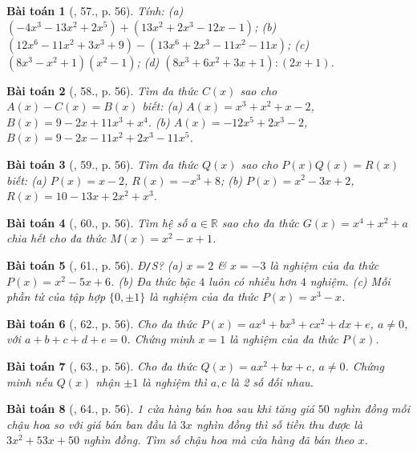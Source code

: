 \documentclass{article}
\newtheorem{baitoan}{Bài toán}
\begin{document}
\begin{baitoan}[\cite{SBT_Toan_7_Canh_Dieu_tap_2}, 57., p. 56]
	Tính: (a) $(-4x^3 - 13x^2 + 2x^5) + (13x^2 + 2x^3 - 12x - 1)$; (b) $(12x^6 - 11x^2 + 3x^3 + 9) - (13x^6 + 2x^3 - 11x^2 - 11x)$; (c) $(8x^3 - x^2 + 1)(x^2 - 1)$; (d) $(8x^3 + 6x^2 + 3x + 1):(2x + 1)$.
\end{baitoan}

\begin{baitoan}[\cite{SBT_Toan_7_Canh_Dieu_tap_2}, 58., p. 56]
	Tìm đa thức $C(x)$ sao cho $A(x) - C(x) = B(x)$ biết: (a) $A(x) = x^3 + x^2 + x - 2$, $B(x) = 9 - 2x + 11x^3 + x^4$. (b) $A(x) = -12x^5 + 2x^3 - 2$, $B(x) = 9 - 2x - 11x^2 + 2x^3 - 11x^5$.
\end{baitoan}

\begin{baitoan}[\cite{SBT_Toan_7_Canh_Dieu_tap_2}, 59., p. 56]
	Tìm đa thức $Q(x)$ sao cho $P(x)Q(x) = R(x)$ biết: (a) $P(x) = x - 2$, $R(x) = -x^3 + 8$; (b) $P(x) = x^2 - 3x + 2$, $R(x) = 10 - 13x + 2x^2 + x^3$.
\end{baitoan}

\begin{baitoan}[\cite{SBT_Toan_7_Canh_Dieu_tap_2}, 60., p. 56]
	Tìm hệ số $a\in\mathbb{R}$ sao cho đa thức $G(x) = x^4 + x^2 + a$ chia hết cho đa thức $M(x) = x^2 - x + 1$.
\end{baitoan}

\begin{baitoan}[\cite{SBT_Toan_7_Canh_Dieu_tap_2}, 61., p. 56]
	\emph{Đ\texttt{/}S?} (a) $x = 2$ \& $x = -3$ là nghiệm của đa thức $P(x) = x^2 - 5x + 6$. (b) Đa thức bậc $4$ luôn có nhiều hơn $4$ nghiệm. (c) Mỗi phần tử của tập hợp $\{0,\pm1\}$ là nghiệm của đa thức $P(x) = x^3 - x$.
\end{baitoan}

\begin{baitoan}[\cite{SBT_Toan_7_Canh_Dieu_tap_2}, 62., p. 56]
	Cho đa thức $P(x) = ax^4 + bx^3 + cx^2 + dx + e$, $a\ne0$, với $a + b + c + d + e = 0$. Chứng minh $x = 1$ là nghiệm của đa thức $P(x)$.
\end{baitoan}

\begin{baitoan}[\cite{SBT_Toan_7_Canh_Dieu_tap_2}, 63., p. 56]
	Cho đa thức $Q(x) = ax^2 + bx + c$, $a\ne0$. Chứng minh nếu $Q(x)$ nhận $\pm1$ là nghiệm thì $a,c$ là 2 số đối nhau.
\end{baitoan}

\begin{baitoan}[\cite{SBT_Toan_7_Canh_Dieu_tap_2}, 64., p. 56]
	1 cửa hàng bán hoa sau khi tăng giá $50$ nghìn đồng mỗi chậu hoa so với giá bán ban đầu là $3x$ nghìn đồng thì số tiền thu được là $3x^2 + 53x + 50$ nghìn đồng. Tìm số chậu hoa mà cửa hàng đã bán theo $x$.
\end{baitoan}
\end{document}

